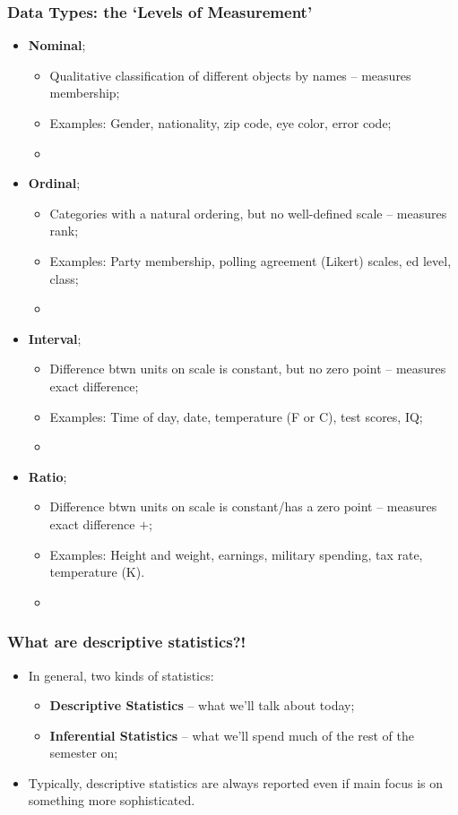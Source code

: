 \documentclass[aspectratio=169]{beamer}
\theoremstyle{principle}
\begin{document}
\begin{frame}
\frametitle{Data Types: the `Levels of Measurement'} 
\begin{itemize}
\item \textbf{Nominal};
\begin{itemize}
\item Qualitative classification of different objects by names -- measures membership;
\item Examples: Gender, nationality, zip code, eye color, error code;
\item[]
\end{itemize}

\item \textbf{Ordinal};
\begin{itemize}
\item Categories with a natural ordering, but no well-defined scale -- measures rank;
\item Examples: Party membership, polling agreement (Likert) scales, ed level, class;
\item[]
\end{itemize}

\item \textbf{Interval};
\begin{itemize}
\item Difference btwn units on scale is constant, but no zero point -- measures exact difference;
\item Examples: Time of day, date, temperature (F or C), test scores, IQ;
\item[]
\end{itemize}

\item \textbf{Ratio};
\begin{itemize}
\item Difference btwn units on scale is constant/has a zero point -- measures exact difference $+$;
\item Examples: Height and weight, earnings, military spending, tax rate, temperature (K).
\item[]
\end{itemize}
\end{itemize}
\end{frame}

\begin{frame}
\frametitle{What are descriptive statistics?!}
\begin{itemize}
\item In general, two kinds of statistics:
\begin{itemize}
\item \textbf{Descriptive Statistics} -- what we'll talk about today;
\item \textbf{Inferential Statistics} -- what we'll spend much of the rest of the semester on;
\end{itemize}
\bigskip
\bigskip
\item Typically, descriptive statistics are always reported even if main focus is on something more sophisticated.
\end{itemize}
\end{frame}
\end{document}
